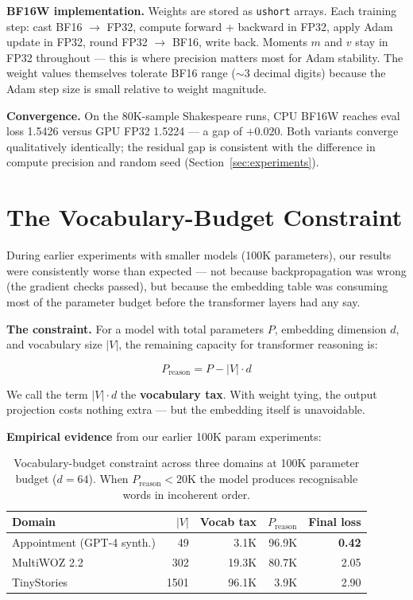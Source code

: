 \documentclass[11pt]{article}
\newcommand{\bfsixteenloss}{0.020}
\newcommand{\gpuvaloss}{1.5224}
\newcommand{\cpubfvaloss}{1.5426}
\begin{document}
\textbf{BF16W implementation.} Weights are stored as \texttt{ushort} arrays.
Each training step: cast BF16 $\to$ FP32, compute forward + backward in FP32,
apply Adam update in FP32, round FP32 $\to$ BF16, write back.
Moments $m$ and $v$ stay in FP32 throughout --- this is where precision matters most
for Adam stability. The weight values themselves tolerate BF16 range ($\sim$3 decimal
digits) because the Adam step size is small relative to weight magnitude.

\textbf{Convergence.} On the 80K-sample Shakespeare runs, CPU BF16W
reaches eval loss \cpubfvaloss{} versus GPU FP32 \gpuvaloss{} --- a gap of $+\bfsixteenloss$.
Both variants converge qualitatively identically; the residual gap is consistent
with the difference in compute precision and random seed (Section~\ref{sec:experiments}).

\section{The Vocabulary-Budget Constraint}

\label{sec:vocab}

During earlier experiments with smaller models (100K parameters), our results were
consistently worse than expected --- not because backpropagation was wrong (the
gradient checks passed), but because the embedding table was consuming most of the
parameter budget before the transformer layers had any say.

\textbf{The constraint.} For a model with total parameters $P$, embedding dimension
$d$, and vocabulary size $|V|$, the remaining capacity for transformer reasoning is:

\begin{equation}
P_{\text{reason}} = P - |V| \cdot d
\label{eq:vocab-budget}
\end{equation}

We call the term $|V| \cdot d$ the \textbf{vocabulary tax}. With weight tying, the
output projection costs nothing extra --- but the embedding itself is unavoidable.

\textbf{Empirical evidence} from our earlier 100K param experiments:

\begin{table}[H]
\centering
\begin{tabular}{lrrrr}
\toprule
Domain & $|V|$ & Vocab tax & $P_\text{reason}$ & Final loss \\
\midrule
Appointment (GPT-4 synth.) & 49   & 3.1K  & 96.9K & \textbf{0.42} \\
MultiWOZ 2.2               & 302  & 19.3K & 80.7K & 2.05 \\
TinyStories                & 1501 & 96.1K & 3.9K  & 2.90 \\
\bottomrule
\end{tabular}
\caption{Vocabulary-budget constraint across three domains at 100K parameter budget
($d{=}64$). When $P_\text{reason} < 20$K the model produces recognisable words in
incoherent order.}
\label{tab:vocab-budget}
\end{table}
\end{document}
